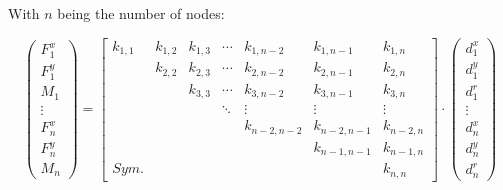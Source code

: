 With $n$ being the number of nodes:

\begin{equation} \label{system}
    \begin{pmatrix}
        F_{1}^x \\
        F_{1}^y \\
        M_{1} \\
        \vdots \\
        F_{n}^x \\
        F_{n}^y \\
        M_{n}
    \end{pmatrix} = \begin{bmatrix}
        k_{1,1}  & k_{1,2} & k_{1,3}  & \cdots & k_{1,n-2}   & k_{1,n-1}   & k_{1,n}   \\
                 & k_{2,2} & k_{2,3}  & \cdots & k_{2,n-2}   & k_{2,n-1}   & k_{2,n}   \\
                 &         & k_{3,3}  & \cdots & k_{3,n-2}   & k_{3,n-1}   & k_{3,n}   \\
                 &         &          & \ddots & \vdots      & \vdots      & \vdots    \\
                 &         &          &        & k_{n-2,n-2} & k_{n-2,n-1} & k_{n-2,n} \\
                 &         &          &        &             & k_{n-1,n-1} & k_{n-1,n} \\
        Sym.     &         &          &        &             &             & k_{n,n}   
    \end{bmatrix} \cdot \begin{pmatrix}
        d_{1}^x \\
        d_{1}^y \\
        d_{1}^r \\
        \vdots \\
        d_n^x \\
        d_n^y \\
        d_n^r
    \end{pmatrix}
\end{equation}

